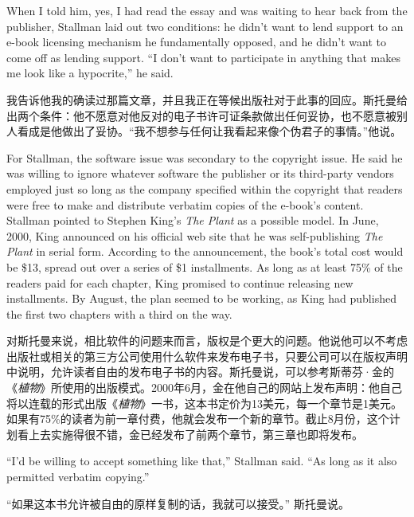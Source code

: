 \ifdefined\eng
When I told him, yes, I had read the essay and was waiting to hear back from the publisher, Stallman laid out two conditions: he didn't want to lend support to an e-book licensing mechanism he fundamentally opposed, and he didn't want to come off as lending support. ``I don't want to participate in anything that makes me look like a hypocrite,'' he said.
\fi

\ifdefined\chs
我告诉他我的确读过那篇文章，并且我正在等候出版社对于此事的回应。斯托曼给出两个条件：他不愿意对他反对的电子书许可证条款做出任何妥协，也不愿意被别人看成是他做出了妥协。“我不想参与任何让我看起来像个伪君子的事情。”他说。
\fi

\ifdefined\eng
For Stallman, the software issue was secondary to the copyright issue. He said he was willing to ignore whatever software the publisher or its third-party vendors employed just so long as the company specified within the copyright that readers were free to make and distribute verbatim copies of the e-book's content. Stallman pointed to Stephen King's \textit{The Plant} as a possible model. In June, 2000, King announced on his official web site that he was self-publishing \textit{The Plant} in serial form. According to the announcement, the book's total cost would be \$13, spread out over a series of \$1 installments. As long as at least 75\% of the readers paid for each chapter, King promised to continue releasing new installments. By August, the plan seemed to be working, as King had published the first two chapters with a third on the way.
\fi

\ifdefined\chs
对斯托曼来说，相比软件的问题来而言，版权是个更大的问题。他说他可以不考虑出版社或相关的第三方公司使用什么软件来发布电子书，只要公司可以在版权声明中说明，允许读者自由的发布电子书的内容。斯托曼说，可以参考斯蒂芬·金的《\textit{植物}》所使用的出版模式。2000年6月，金在他自己的网站上发布声明：他自己将以连载的形式出版《\textit{植物}》一书，这本书定价为13美元，每一个章节是1美元。如果有75\%的读者为前一章付费，他就会发布一个新的章节。截止8月份，这个计划看上去实施得很不错，金已经发布了前两个章节，第三章也即将发布。
\fi

\ifdefined\eng
``I'd be willing to accept something like that,'' Stallman said. ``As long as it also permitted verbatim copying.'' %
\fi

\ifdefined\chs
“如果这本书允许被自由的原样复制的话，我就可以接受。” 斯托曼说。%
\fi

